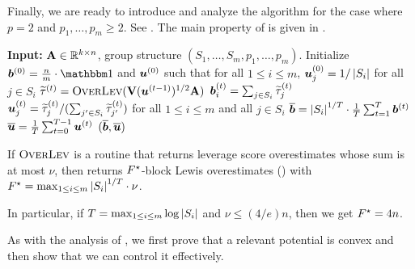 \documentclass[11pt]{article}
\numberwithin{equation}{section}
\begin{document}
Finally, we are ready to introduce and analyze the algorithm for the case where $p=2$ and $p_1,\dots,p_m \ge 2$. See . The main property of  is given in .

\begin{algorithm}[ht]
\caption{Algorithm to compute block Lewis weight overestimates, $p=2$ and $p_1,\dots,p_m \ge 2$}
\begin{algorithmic}[1]\label{alg:blw_base}
\State \textbf{Input:} \(\mathbf{A} \in \mathbb{R}^{k \times n}\), group structure \((S_1,\dots,S_m,p_1,\dots,p_m)\).
\State Initialize \(\vb^{(0)} = \frac{n}{m} \cdot \onev\) and \(\bm{u}^{(0)}\) such that for all $1 \le i \le m$, \(\bm{u}^{(0)}_j = 1/\left\lvert S_i \right\rvert\) for all \(j \in S_i\)
    \State \(\widetilde{\tau}^{(t)} = \textsc{OverLev}(\mathbf{V}(\bm{u}^{(t-1)})^{1/2}\mathbf{A})\) 
    \State \(\bm{b}_{i}^{(t)} = \sum_{j \in S_i} \widetilde{\tau}_j^{(t)}\)
    \State \(\bm{u}^{(t)}_j = \widetilde{\tau}_j^{(t)}/(\sum_{j' \in S_i} \widetilde{\tau}_{j'}^{(t)})\) for all $1 \le i \le m$ and all $j \in S_i$
\EndFor
\State \(\overline{\bm{b}} = \left\lvert S_i \right\rvert^{1/T}\cdot\frac{1}{T}\sum_{t=1}^T \bm{b}^{(t)}\)
\State \(\overline{\bm{u}} = \frac{1}{T}\sum_{t=0}^{T-1} \bm{u}^{(t)}\)
\State \Return \((\overline{\bm{b}},\overline{\bm{u}})\)
\end{algorithmic}
\end{algorithm}

\begin{lemma}
\label{thm:blw_base}
If $\textsc{OverLev}$ is a routine that returns leverage score overestimates whose sum is at most $\nu$, then  returns $F^{\star}$-block Lewis overestimates () with $F^{\star} = \max_{1 \le i \le m} \left\lvert S_i \right\rvert^{1/T} \cdot \nu$.

In particular, if $T = \max_{1 \le i \le m} \log\left\lvert S_i \right\rvert$ and $\nu \le (4/e)n$, then we get $F^{\star} = 4n$.
\end{lemma}

As with the analysis of , we first prove that a relevant potential is convex and then show that we can control it effectively.
\end{document}
